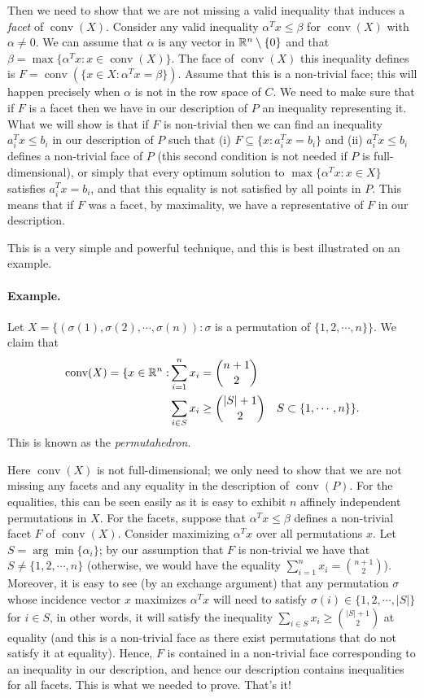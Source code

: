 \documentclass[12pt]{article}
\newcommand{\conv}{\operatorname{conv}}
\begin{document}
\begin{enumerate}
Then we need to show that we are not missing a valid inequality that
induces a {\it facet} of $\conv(X)$. Consider any valid inequality
$\alpha^T x\leq \beta$ for $\conv(X)$ with $\alpha\neq 0$. We can
assume that $\alpha$ is any vector in ${\mathbb R}^n\setminus \{0\}$ and that
$\beta=\max\{\alpha^T x: x\in \conv(X)\}$. The face of $\conv(X)$ this
inequality defines is $F=\conv(\{x\in X: \alpha^T x=\beta\})$. Assume
that this is a non-trivial face; this will happen precisely when
$\alpha$ is not in the row space of $C$. We need to make sure that if
$F$ is a facet then we have in our description of $P$ an inequality
representing it. What we will show is that if $F$ is non-trivial then
we can find an inequality $a_i^T x\leq b_i$ in our description of $P$
such that (i) $F\subseteq \{x: a_i^T x=b_i\}$ and (ii) $a_i^Tx\leq
b_i$ defines a non-trivial face of $P$ (this second condition is not
needed if $P$ is full-dimensional), or simply that every optimum
solution to $\max\{\alpha^T x: x\in X\}$ satisfies $a_i^Tx=b_i$, and
that this equality is not satisfied by all points in $P$. This
means that if $F$ was a facet, by maximality, we have a representative
of $F$ in our description.

This is a very simple and powerful technique, and this is best
illustrated on an example. 

\paragraph{Example.} Let $X=\{(\sigma(1), \sigma(2), \cdots,
\sigma(n)): \sigma$ is a permutation of $\{1,2,\cdots, n\}\}$. 
We claim that 
\begin{eqnarray*} 
  \conv(X)=\{x\in \R^n: & \sum_{i=1}^n x_i ={n+1 \choose 2} \\
  & \sum_{i\in S} x_i \geq {|S|+1 \choose 2} & S \subset \{1,\cdots,
  n\} \}.
\end{eqnarray*}
This is known as the {\it permutahedron}.

Here $\conv(X)$ is not full-dimensional; we only need to show that we
are not missing any facets and any equality in the description of
$\conv(P)$. For the equalities, this can be seen easily as it is easy
to exhibit $n$ affinely independent permutations in $X$. For the
facets, suppose that $\alpha^T x\leq \beta$ defines a non-trivial
facet $F$ of $\conv(X)$. Consider maximizing $\alpha^T x$ over all
permutations $x$. Let $S=\arg\min\{\alpha_i\}$; by our assumption that
$F$ is non-trivial we have that $S\neq \{1,2,\cdots,n\}$ (otherwise,
we would have the equality $\sum_{i=1}^n x_i ={n+1 \choose
  2}$). Moreover, it is easy to see (by an exchange argument) that any
permutation $\sigma$ whose incidence vector $x$ maximizes $\alpha^Tx$
will need to satisfy $\sigma(i)\in\{1,2,\cdots,|S|\}$ for $i\in S$, in
other words, it will satisfy the inequality $\sum_{i \in S} x_i \geq
{|S|+1 \choose 2}$ at equality (and this is a non-trivial face as
there exist permutations that do not satisfy it at equality). Hence,
$F$ is contained in a non-trivial face corresponding to an inequality
in our description, and hence our description contains inequalities
for all facets. This is what we needed to prove.  That's it!


\end{enumerate}
\end{document}
